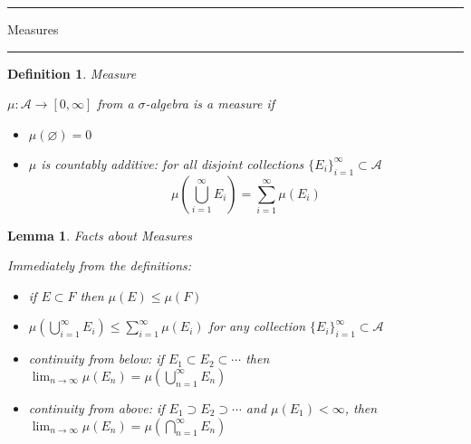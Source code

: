 \documentclass[12pt]{Qual}
\newtheorem{definition}{Definition}
\newtheorem{lemma}{Lemma}
\begin{document}
\begin{center}
\noindent\textcolor{blue!60!black}{\rule{15cm}{1mm}}
\Huge \faBug\faPuzzlePiece\faCoffee Measures \faCoffee\faPuzzlePiece\faBug
\vspace{-0.5cm}
\noindent\textcolor{blue!60!black}{\rule{15cm}{1mm}}
\end{center}
\vspace{0.5cm}
\begin{definition}{\Large\textit{Measure}}
$\,$

$\mu:\mathscr{A}\to[0,\infty]$ from a $\sigma$-algebra is a measure if
\begin{itemize}
\setlength\itemsep{-0.4cm}
\renewcommand\labelitemi{\faCoffee}
    \item $\mu(\varnothing)=0$\\
    \item $\mu$ is countably additive: for all disjoint collections $\{E_i\}_{i=1}^\infty\subset\mathscr{A}$ $$\mu\left(\bigcup_{i=1}^\infty E_i\right)=\sum_{i=1}^\infty\mu(E_i)$$
\end{itemize}

\end{definition}
\vspace{0.5cm}
\begin{lemma}{\Large\textit{Facts about Measures}}

Immediately from the definitions:
\begin{itemize}
\setlength\itemsep{-0.35cm}
\renewcommand\labelitemi{\faCoffee}
    \item if $E\subset F$ then $\mu(E)\le\mu(F)$ \\[0.1cm]
    \item $\displaystyle \mu\left(\bigcup_{i=1}^\infty E_i\right)\le\sum_{i=1}^\infty\mu(E_i)$ for any collection $\{E_i\}_{i=1}^\infty\subset\mathscr{A}$
    \item continuity from below: if $E_1\subset E_2\subset\cdots$ then $\displaystyle\lim_{n\to\infty}\mu(E_n)= \mu\left(\bigcup_{n=1}^\infty E_n\right)$
    \item continuity from above: if $E_1\supset E_2\supset\cdots$ \textit{and} $\mu(E_1)<\infty$, then $\displaystyle\lim_{n\to\infty}\mu(E_n)= \mu\left(\bigcap_{n=1}^\infty E_n\right)$
\end{itemize}

\end{lemma}
\vspace{0.5cm}
\end{document}
